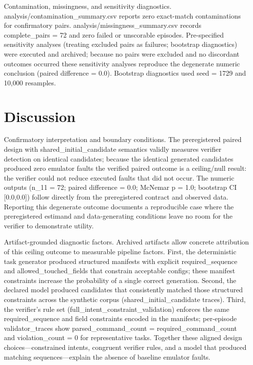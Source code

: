 \documentclass[conference]{IEEEtran}
\begin{document}
Contamination, missingness, and sensitivity diagnostics. analysis/contamination\_summary.csv reports zero exact-match contaminations for confirmatory pairs. analysis/missingness\_summary.csv records complete\_pairs = 72 and zero failed or unscorable episodes. Pre-specified sensitivity analyses (treating excluded pairs as failures; bootstrap diagnostics) were executed and archived; because no pairs were excluded and no discordant outcomes occurred these sensitivity analyses reproduce the degenerate numeric conclusion (paired difference = 0.0). Bootstrap diagnostics used seed = 1729 and 10,000 resamples.

\section{Discussion}
Confirmatory interpretation and boundary conditions. The preregistered paired design with shared\_initial\_candidate semantics validly measures verifier detection on identical candidates; because the identical generated candidates produced zero emulator faults the verified paired outcome is a ceiling/null result: the verifier could not reduce executed faults that did not occur. The numeric outputs (n\_11 = 72; paired difference = 0.0; McNemar p = 1.0; bootstrap CI [0.0,0.0]) follow directly from the preregistered contract and observed data. Reporting this degenerate outcome documents a reproducible case where the preregistered estimand and data-generating conditions leave no room for the verifier to demonstrate utility.

Artifact-grounded diagnostic factors. Archived artifacts allow concrete attribution of this ceiling outcome to measurable pipeline factors. First, the deterministic task generator produced structured manifests with explicit required\_sequence and allowed\_touched\_fields that constrain acceptable configs; these manifest constraints increase the probability of a single correct generation. Second, the declared model produced candidates that consistently matched those structured constraints across the synthetic corpus (shared\_initial\_candidate traces). Third, the verifier's rule set (full\_intent\_constraint\_validation) enforces the same required\_sequence and field constraints encoded in the manifests; per-episode validator\_traces show parsed\_command\_count = required\_command\_count and violation\_count = 0 for representative tasks. Together these aligned design choices---constrained intents, congruent verifier rules, and a model that produced matching sequences---explain the absence of baseline emulator faults.
\end{document}
